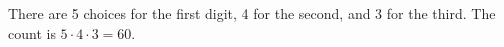 There are 5 choices for the first digit, 4 for the second, and 3 for the third. The count is $5\cdot4\cdot3=\boxed{60}$.
